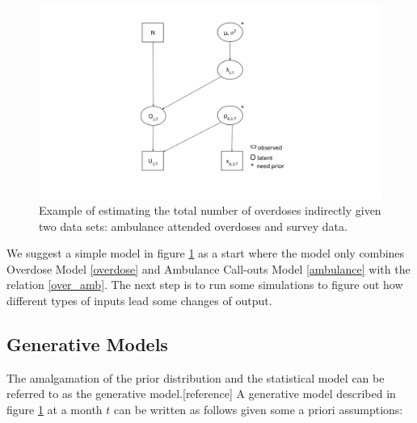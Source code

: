 \documentclass[12pt]{article}
\begin{document}
{\begin{figure}[htb]
	\centering
	\includegraphics[width=200mm,scale=0.5]{Figures/simple_drawing}
	\caption{Example of estimating the total number of overdoses indirectly given two data sets: ambulance attended overdoses and survey data.}
	\label{simple_draw}
\end{figure}

We suggest a simple model in figure \ref{simple_draw} as a start where the model only combines Overdose Model \ref{overdose} and Ambulance Call-outs Model \ref{ambulance} with the relation \ref{over_amb}. The next step is to run some simulations to figure out how different types of inputs lead some changes of output.

\subsection{Generative Models}
The amalgamation of the prior distribution and the statistical model can be referred to as the generative model.[reference] A generative model described in figure \ref{simple_draw} at a month $t$ can be written as follows given some a priori assumptions:

}
\end{document}
